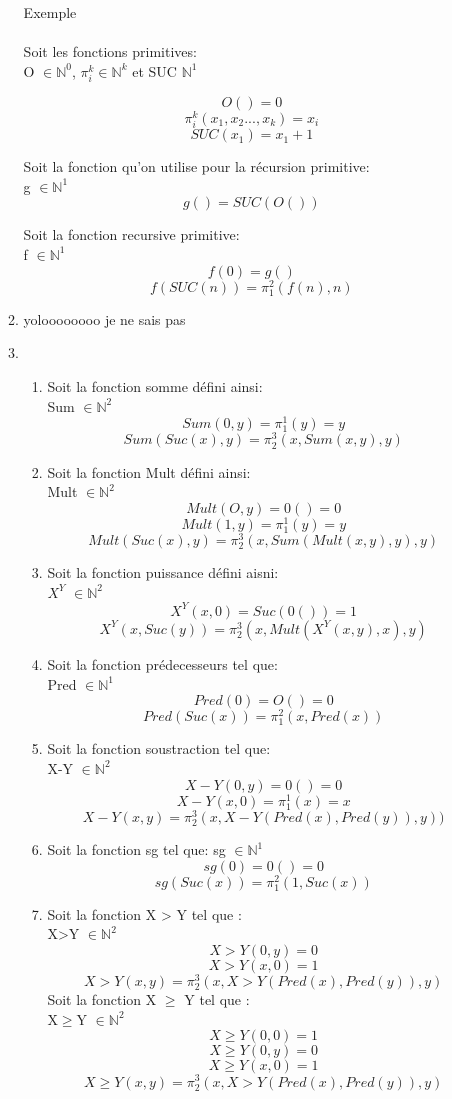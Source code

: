 \documentclass[]{article}
\begin{document}
\begin{enumerate}
\begin{enumerate}
  Exemple\\ \\
Soit les fonctions primitives: \\
O $\in \mathbb{N}^0$, $\pi_i^k \in \mathbb{N}^k$ et SUC $\mathbb{N}^1$ 

 \[O() = 0 \] 
\[\pi_i^k(x_1,x_2...,x_k) = x_i \] 
\[SUC(x_1) = x_1 + 1 \] 

Soit la fonction qu'on utilise pour la récursion primitive:\\
g $\in \mathbb{N}^1$
\[g() = SUC(O()) \]

Soit la fonction recursive primitive:\\
f $\in \mathbb{N}^1$
\[f(0) = g()\]
\[f(SUC(n)) = \pi_1^2(f(n),n)\]
  
\item  yoloooooooo je ne sais pas 
\item \begin{enumerate}\item Soit la fonction somme défini ainsi:\\
 Sum $\in \mathbb{N}^2$ 
\[Sum(0,y) = \pi_1^1(y) = y \]
\[Sum(Suc(x),y) = \pi_2^3(x,Sum(x,y),y)\]
\item Soit la fonction Mult défini ainsi: \\
Mult $\in \mathbb{N}^2$
\[Mult(O,y) = 0() = 0\]
\[Mult(1,y) = \pi_1^1(y) = y\]
\[Mult(Suc(x),y) = \pi_2^3(x,Sum(Mult(x,y),y),y)\]
\item Soit la fonction puissance défini aisni:\\
 $X^Y$ $\in \mathbb{N}^2$
\[X^Y(x,0) = Suc(0()) = 1\]
\[X^Y(x,Suc(y)) = \pi_2^3(x,Mult(X^Y(x,y),x),y)\]
\item Soit la fonction prédecesseurs tel que: \\
Pred $\in \mathbb{N}^1$
\[Pred(0) = O() = 0\]
\[Pred(Suc(x)) = \pi_1^2(x,Pred(x))\]
\item Soit la fonction soustraction tel que:\\
X-Y $\in \mathbb{N}^2$
\[X-Y(0,y) = 0() = 0\]
\[X-Y(x,0) = \pi_1^1(x) = x\]
\[X-Y(x,y) = \pi_2^3(x,X-Y(Pred(x),Pred(y)),y))\]
\item Soit la fonction sg tel que:
sg $\in \mathbb{N}^1$
\[sg(0) = 0() = 0\]
\[sg(Suc(x)) = \pi_1^2(1,Suc(x))\]
\item Soit la fonction X > Y tel que :\\
X>Y $\in \mathbb{N}^2$
\[X>Y(0,y) = 0\]
\[X>Y(x,0) = 1\]
\[X>Y(x,y) = \pi_2^3(x,X>Y(Pred(x),Pred(y)),y)\]
Soit la fonction X $\ge$ Y tel que :\\
X$\ge$Y $\in \mathbb{N}^2$
\[X\ge Y(0,0) = 1\]
\[X\ge Y(0,y) = 0\]
\[X\ge Y(x,0) = 1\]
\[X\ge Y(x,y) = \pi_2^3(x,X>Y(Pred(x),Pred(y)),y)\]


\end{enumerate}
\end{enumerate}
\end{enumerate}
\end{document}
